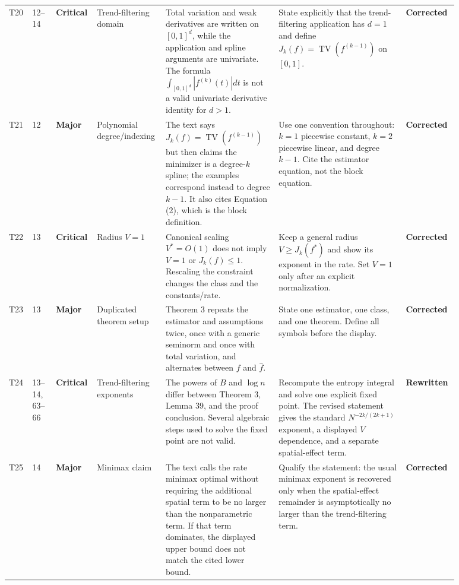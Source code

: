 \documentclass[11pt]{article}
\newcommand{\status}[1]{\textcolor{implgreen}{\textbf{#1}}}
\begin{document}
\begin{landscape}
\begin{longtable}{L{0.04\linewidth}L{0.055\linewidth}L{0.065\linewidth}L{0.11\linewidth}L{0.245\linewidth}L{0.275\linewidth}L{0.095\linewidth}}
T20 & 12--14 & \textcolor{crit}{\textbf{Critical}} & Trend-filtering domain & Total variation and weak derivatives are written on $[0,1]^d$, while the application and spline arguments are univariate. The formula $\int_{[0,1]^d}|f^{(k)}(t)|dt$ is not a valid univariate derivative identity for $d>1$. & State explicitly that the trend-filtering application has $d=1$ and define $J_k(f)=\operatorname{TV}(f^{(k-1)})$ on $[0,1]$. & \status{Corrected}\\
T21 & 12 & \textcolor{major}{\textbf{Major}} & Polynomial degree/indexing & The text says $J_k(f)=\operatorname{TV}(f^{(k-1)})$ but then claims the minimizer is a degree-$k$ spline; the examples correspond instead to degree $k-1$. It also cites Equation (2), which is the block definition. & Use one convention throughout: $k=1$ piecewise constant, $k=2$ piecewise linear, and degree $k-1$. Cite the estimator equation, not the block equation. & \status{Corrected}\\
T22 & 13 & \textcolor{crit}{\textbf{Critical}} & Radius $V=1$ & Canonical scaling $V^*=O(1)$ does not imply $V=1$ or $J_k(f)\le1$. Rescaling the constraint changes the class and the constants/rate. & Keep a general radius $V\ge J_k(f^*)$ and show its exponent in the rate. Set $V=1$ only after an explicit normalization. & \status{Corrected}\\
T23 & 13 & \textcolor{major}{\textbf{Major}} & Duplicated theorem setup & Theorem 3 repeats the estimator and assumptions twice, once with a generic seminorm and once with total variation, and alternates between $f$ and $\widehat f$. & State one estimator, one class, and one theorem. Define all symbols before the display. & \status{Corrected}\\
T24 & 13--14, 63--66 & \textcolor{crit}{\textbf{Critical}} & Trend-filtering exponents & The powers of $B$ and $\log n$ differ between Theorem 3, Lemma 39, and the proof conclusion. Several algebraic steps used to solve the fixed point are not valid. & Recompute the entropy integral and solve one explicit fixed point. The revised statement gives the standard $N^{-2k/(2k+1)}$ exponent, a displayed $V$ dependence, and a separate spatial-effect term. & \status{Rewritten}\\
T25 & 14 & \textcolor{major}{\textbf{Major}} & Minimax claim & The text calls the rate minimax optimal without requiring the additional spatial term to be no larger than the nonparametric term. If that term dominates, the displayed upper bound does not match the cited lower bound. & Qualify the statement: the usual minimax exponent is recovered only when the spatial-effect remainder is asymptotically no larger than the trend-filtering term. & \status{Corrected}\\

\end{longtable}
\end{landscape}
\end{document}
